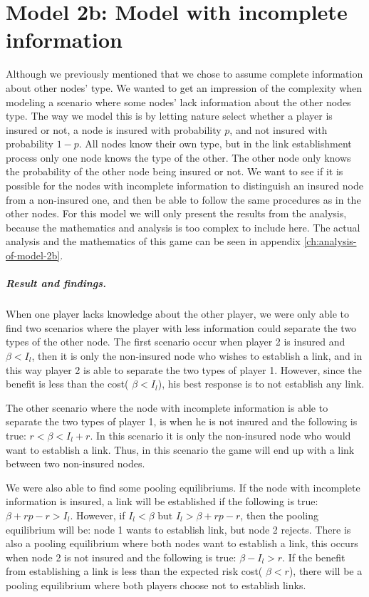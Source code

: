 \section{Model 2b: Model with incomplete information}
\label{Model with incomplete information}
Although we previously mentioned that we chose to assume complete information about other nodes' type. We wanted to get an impression of the complexity when modeling a scenario where some nodes' lack information about the other nodes type. The way we model this is by letting nature select whether a player is insured or not, a node is insured with probability $p$, and not insured with probability $1-p$. 
All nodes know their own type, but in the link establishment process only one node knows the type of the other. The other node only knows the probability of the other node being insured or not. 
We want to see if it is possible for the nodes with incomplete information to distinguish an insured node from a non-insured one, and then be able to follow the same procedures as in the other nodes. 
For this model we will only present the results from the analysis, because the mathematics and analysis is too complex to include here. The actual analysis and the mathematics of this game can be seen in appendix \ref{ch:analysis-of-model-2b}.

\subparagraph{Result and findings.}
When one player lacks knowledge about the other player, we were only able to find two scenarios where the player with less information could separate the two types of the other node. The first scenario occur when player 2 is insured and $\beta<I_{l}$, then it is only the non-insured node who wishes to establish a link, and in this way player 2 is able to separate the two types of player 1. However, since the benefit is less than the cost( $\beta<I_{l}$), his best response is to not establish any link.

The other scenario where the node with incomplete information is able to separate the two types of player 1, is when he is not insured and the following is true: $r<\beta<I_{l}+r$. In this scenario it is only the non-insured node who would want to establish a link. Thus, in this scenario the game will end up with a link between two non-insured nodes.

We were also able to find some pooling equilibriums. If the node with incomplete information is insured, a link will be established if the following is true: $\beta+rp-r>I_{l}$. However, if $I_{l}<\beta \text{ but } I_{l}>\beta+rp-r$, then the pooling equilibrium will be: node 1 wants to establish link, but node 2 rejects.
There is also a pooling equilibrium where both nodes want to establish a link, this occurs when node 2 is not insured and the following is true: $\beta-I_{l}>r$. If the benefit from establishing a link is less than the expected risk cost( $\beta<r$), there will be a pooling equilibrium where both players choose not to establish links. 

